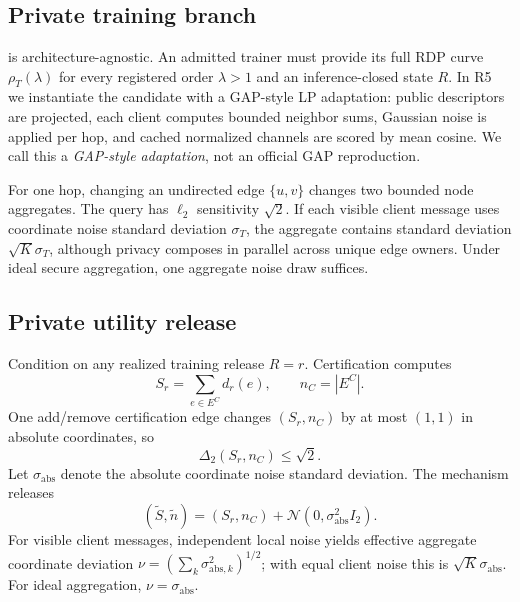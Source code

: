\section{\method{}}
\label{sec:method}

\subsection{Private training branch}

\method{} is architecture-agnostic. An admitted trainer must provide its full
RDP curve $\rho_T(\lambda)$ for every registered order $\lambda>1$ and an
inference-closed state $R$. In R5 we instantiate the candidate with a
GAP-style LP adaptation: public descriptors are projected, each client
computes bounded neighbor sums, Gaussian noise is applied per hop, and cached
normalized channels are scored by mean cosine. We call this a
\emph{GAP-style adaptation}, not an official GAP reproduction.

For one hop, changing an undirected edge $\{u,v\}$ changes two bounded node
aggregates. The query has $\ell_2$ sensitivity $\sqrt{2}$. If each visible
client message uses coordinate noise standard deviation $\sigma_T$, the
aggregate contains standard deviation $\sqrt{K}\sigma_T$, although privacy
composes in parallel across unique edge owners. Under ideal secure
aggregation, one aggregate noise draw suffices.

\subsection{Private utility release}

Condition on any realized training release $R=r$. Certification computes
\begin{equation}
 S_r=\sum_{e\in E^C}d_r(e),\qquad n_C=|E^C|.
\end{equation}
One add/remove certification edge changes $(S_r,n_C)$ by at most $(1,1)$ in
absolute coordinates, so
\begin{equation}
 \Delta_2(S_r,n_C)\leq\sqrt{2}.
\end{equation}
Let $\sigma_{\mathrm{abs}}$ denote the absolute coordinate noise standard
deviation. The mechanism releases
\begin{equation}
 (\widetilde S,\widetilde n)
 =(S_r,n_C)+\mathcal N(0,\sigma_{\mathrm{abs}}^2 I_2).
\end{equation}
For visible client messages, independent local noise yields effective
aggregate coordinate deviation
$\nu=(\sum_k\sigma_{\mathrm{abs},k}^2)^{1/2}$; with equal client noise this is
$\sqrt{K}\sigma_{\mathrm{abs}}$. For ideal aggregation,
$\nu=\sigma_{\mathrm{abs}}$.

